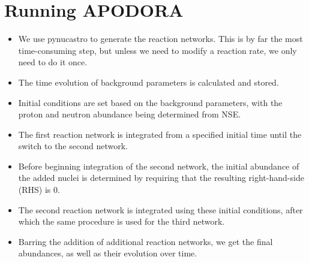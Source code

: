 \section{Running APODORA}
\label{sec:structure}

\begin{itemize}
    \item We use pynucastro to generate the reaction networks. This is by far the most time-consuming step, but unless we need to modify a reaction rate, we only need to do it once.
    \item The time evolution of background parameters is calculated and stored.
    \item Initial conditions are set based on the background parameters, with the proton and neutron abundance being determined from NSE.
    \item The first reaction network is integrated from a specified initial time until the switch to the second network. 
    \item Before beginning integration of the second network, the initial abundance of the added nuclei is determined by requiring that the resulting right-hand-side (RHS) is 0.
    \item The second reaction network is integrated using these initial conditions, after which the same procedure is used for the third network.
    \item Barring the addition of additional reaction networks, we get the final abundances, as well as their evolution over time. %
\end{itemize}

